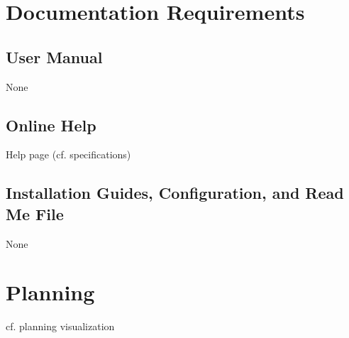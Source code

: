 \documentclass [a4paper, 11pt]{article}
\begin{document}



\section{Documentation Requirements}
\subsection{User Manual}
None

\subsection{Online Help}
Help page (cf. specifications)

\subsection{Installation Guides, Configuration, and Read Me File}
None



\section{Planning}
cf. planning visualization
\end{document}
